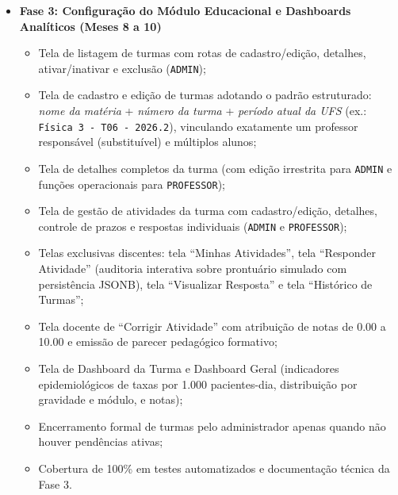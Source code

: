 \begin{itemize}
    \item \textbf{Fase 3: Configuração do Módulo Educacional e Dashboards Analíticos (Meses 8 a 10)}
    \begin{itemize}
        \item Tela de listagem de turmas com rotas de cadastro/edição, detalhes, ativar/inativar e exclusão (\texttt{ADMIN});
        \item Tela de cadastro e edição de turmas adotando o padrão estruturado: \textit{nome da matéria} + \textit{número da turma} + \textit{período atual da UFS} (ex.: \texttt{Física 3 - T06 - 2026.2}), vinculando exatamente um professor responsável (substituível) e múltiplos alunos;
        \item Tela de detalhes completos da turma (com edição irrestrita para \texttt{ADMIN} e funções operacionais para \texttt{PROFESSOR});
        \item Tela de gestão de atividades da turma com cadastro/edição, detalhes, controle de prazos e respostas individuais (\texttt{ADMIN} e \texttt{PROFESSOR});
        \item Telas exclusivas discentes: tela ``Minhas Atividades'', tela ``Responder Atividade'' (auditoria interativa sobre prontuário simulado com persistência JSONB), tela ``Visualizar Resposta'' e tela ``Histórico de Turmas'';
        \item Tela docente de ``Corrigir Atividade'' com atribuição de notas de 0.00 a 10.00 e emissão de parecer pedagógico formativo;
        \item Tela de Dashboard da Turma e Dashboard Geral (indicadores epidemiológicos de taxas por 1.000 pacientes-dia, distribuição por gravidade e módulo, e notas);
        \item Encerramento formal de turmas pelo administrador apenas quando não houver pendências ativas;
        \item Cobertura de 100\% em testes automatizados e documentação técnica da Fase 3.
    \end{itemize}


\end{itemize}

